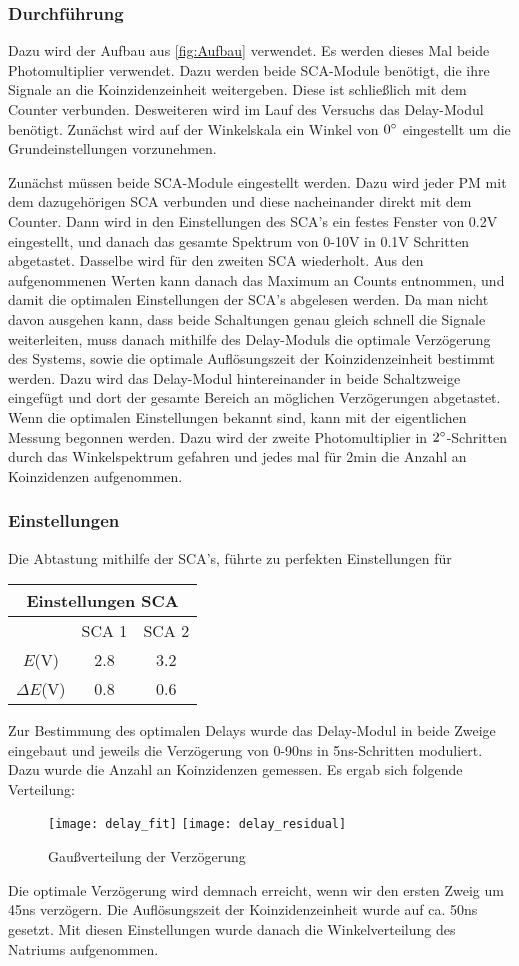 \documentclass{../Misc/MontavonLaTeX/Montavon}
\newcommand{\halfwidth}{0.48\textwidth}
\begin{document}
\subsubsection{Durchführung}
Dazu wird der Aufbau aus \ref{fig:Aufbau} verwendet. Es werden dieses Mal beide Photomultiplier verwendet. Dazu werden beide SCA-Module benötigt, die ihre Signale an die Koinzidenzeinheit weitergeben. Diese ist schließlich mit dem Counter verbunden. Desweiteren wird im Lauf des Versuchs das Delay-Modul benötigt. 
Zunächst wird auf der Winkelskala ein Winkel von $0 ^{\circ}$ eingestellt um die Grundeinstellungen vorzunehmen. 

Zunächst müssen beide SCA-Module eingestellt werden. Dazu wird jeder PM mit dem dazugehörigen SCA verbunden und diese nacheinander direkt mit dem Counter. Dann wird in den Einstellungen des SCA's ein festes Fenster von 0.2V eingestellt, und danach das gesamte Spektrum von 0-10V in 0.1V Schritten abgetastet. Dasselbe wird für den zweiten SCA wiederholt. 
Aus den aufgenommenen Werten kann danach das Maximum an Counts entnommen, und damit die optimalen Einstellungen der SCA's abgelesen werden. 
Da man nicht davon ausgehen kann, dass beide Schaltungen genau gleich schnell die Signale weiterleiten, muss danach mithilfe des Delay-Moduls die optimale Verzögerung des Systems, sowie die optimale Auflösungszeit der Koinzidenzeinheit bestimmt werden. Dazu wird das Delay-Modul hintereinander in beide Schaltzweige 
eingefügt und dort der gesamte Bereich an möglichen Verzögerungen abgetastet. Wenn die optimalen Einstellungen bekannt sind, kann mit der eigentlichen Messung begonnen werden. Dazu wird der zweite Photomultiplier in $2 ^{\circ}$-Schritten durch das Winkelspektrum gefahren und jedes mal für 2min die Anzahl an Koinzidenzen aufgenommen. 
\subsubsection{Einstellungen}
Die Abtastung mithilfe der SCA's, führte zu perfekten Einstellungen für

\begin{tabular}{|c|c|c|}
\hline 
\multicolumn{3}{|c|}{Einstellungen SCA}\tabularnewline
\hline
\hline 
 & SCA 1 & SCA 2\tabularnewline
\hline 
$E$(V) & 2.8 & 3.2\tabularnewline
\hline 
$\Delta E$(V) & 0.8 & 0.6\tabularnewline
\hline
\end{tabular}

Zur Bestimmung des optimalen Delays wurde das Delay-Modul in beide Zweige eingebaut und jeweils die Verzögerung von 0-90ns in 5ns-Schritten moduliert. Dazu wurde die Anzahl an Koinzidenzen gemessen. Es ergab sich folgende Verteilung:
\begin{figure}[htbp]
\texttt{[image: delay\_fit]}
\texttt{[image: delay\_residual]}
\caption{Gaußverteilung der Verzögerung}
\label{fig:Delay}
\end{figure}
Die optimale Verzögerung wird demnach erreicht, wenn wir den ersten Zweig um 45ns verzögern. Die Auflösungszeit der Koinzidenzeinheit wurde auf ca. 50ns gesetzt. 
Mit diesen Einstellungen wurde danach die Winkelverteilung des Natriums aufgenommen. 
\end{document}
